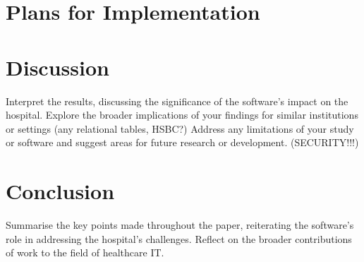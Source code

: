 \documentclass[11pt]{article}
\begin{document}
\section{Plans for Implementation}



\section{Discussion}
Interpret the results, discussing the significance of the software's impact on the hospital.
Explore the broader implications of your findings for similar institutions or settings (any relational tables, HSBC?)
Address any limitations of your study or software and suggest areas for future research or development. (SECURITY!!!)

\section{Conclusion}
Summarise the key points made throughout the paper, reiterating the software's role in addressing the hospital's challenges.
Reflect on the broader contributions of work to the field of healthcare IT.

\begin{thebibliography}{}
\end{thebibliography}
\end{document}
